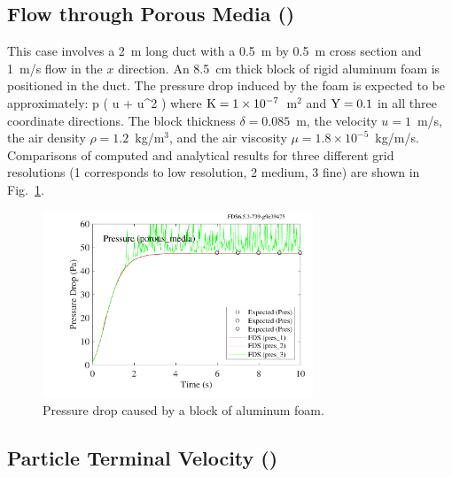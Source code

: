\documentclass[11pt]{book}
\begin{document}
\subsection{Flow through Porous Media (\texorpdfstring{}{porous\_media})}
\label{porous_media}

This case involves a 2~m long duct with a 0.5~m by 0.5~m cross section and 1~m/s flow in the $x$ direction. An 8.5~cm thick block of rigid aluminum foam is positioned in the duct. The pressure drop induced by the foam is expected to be approximately:
\be
   \Delta p \approx \delta \left(  u \; + \; \rho {} u^2 \right)
\ee
where ${\rm K}=1 \times 10^{-7}$~m$^2$ and ${\rm Y}=0.1$ in all three coordinate directions. The block thickness $\delta=0.085$~m, the velocity $u=1$~m/s, the air density $\rho=1.2$~kg/m$^3$, and the air viscosity $\mu=1.8 \times 10^{-5}$~kg/m/s. Comparisons of computed and analytical results for three different grid resolutions (1 corresponds to low resolution, 2 medium, 3 fine) are shown in Fig.~\ref{porous_media_plot}.

\begin{figure}[ht]
\centering
\includegraphics[height=2.2in]{SCRIPT_FIGURES/porous_media}
\caption[Results of the  test case]{Pressure drop caused by a block of aluminum foam.}
\label{porous_media_plot}
\end{figure}




\subsection{Particle Terminal Velocity (\texorpdfstring{}{terminal\_velocity})}
\end{document}
